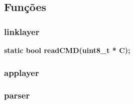 \documentclass[a4paper]{article}
\begin{document}

\subsection{Funções}
\subsubsection{linklayer}
\textbf{static bool readCMD(uint8\_t * C);}

\subsubsection{applayer}

\subsubsection{parser}
\end{document}

